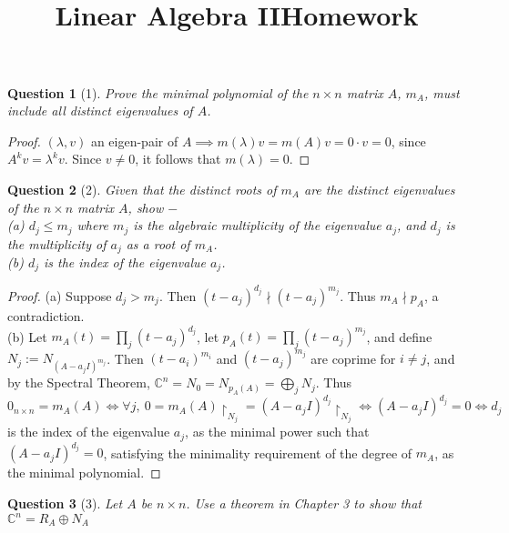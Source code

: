 \documentclass[11pt]{article}
\title{\vspace{-50pt}
\Huge \name
\\\vspace{20pt}
\huge Linear Algebra II\hfill Homework \hw}
\author{}
\date{}
\theoremstyle{quest}
\newtheorem*{question}{Question}
\begin{document}
\maketitle

\begin{question}[1]
Prove the minimal polynomial of the $n \times n$ matrix $A$, $m_A$, must include all distinct eigenvalues of $A$.
\end{question}
\begin{proof}
$(\lambda, v)$ an eigen-pair of $A \implies m(\lambda)v = m(A)v = 0 \cdot v = 0$, since $A^k v = \lambda^k v$. Since $v \ne 0$, it follows that $m(\lambda) = 0$.
\end{proof}
\begin{question}[2]
Given that the distinct roots of $m_A$ are the distinct eigenvalues of the $n \times n$ matrix $A$, show $-$
\\(a) $d_j \le m_j$ where $m_j$ is the algebraic multiplicity of the eigenvalue $a_j$, and $d_j$ is the multiplicity of $a_j$ as a root of  $m_A$.
\\(b) $d_j$ is the index of the eigenvalue $a_j$.
\end{question}
\begin{proof}
(a) Suppose $d_j > m_j$. Then $(t - a_j)^{d_j} \nmid (t - a_j)^{m_j}$. Thus $m_A \nmid p_A$, a contradiction.
\\(b) Let $m_A(t) = \prod_j(t-a_j)^{d_j}$,  let $p_A(t) = \prod_j(t-a_j)^{m_j}$,  and define $N_j := N_{(A-a_jI)^{m_j}}$. Then $(t-a_i)^{m_i}$ and $(t-a_j)^{m_j}$ are coprime for $i \ne j$, and by the Spectral Theorem, $\mathbb{C}^n = N_0 = N_{p_A(A)} = \bigoplus_j N_j$. Thus $0_{n \times n} = m_A(A) \iff \forall j, \ 0 = m_A(A) \restriction_{N_j} = (A - a_jI)^{d_j} \restriction_{N_j} \iff (A - a_jI)^{d_j} = 0 \iff d_j$ is the index of the eigenvalue $a_j$, as the minimal power such that $(A - a_jI)^{d_j} = 0$, satisfying the minimality requirement of the degree of $m_A$, as the minimal polynomial.
\end{proof}
\begin{question}[3]
Let $A$ be $n \times n$. Use a theorem in Chapter 3 to show that $\mathbb{C}^n = R_A \oplus N_A$
\end{question}
\end{document}
